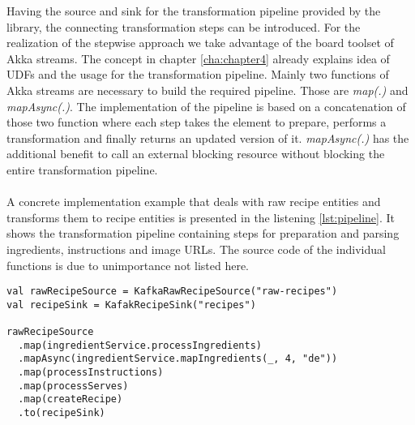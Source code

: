 Having the source and sink for the transformation pipeline provided by the library, the connecting transformation steps can be introduced. For the realization of the stepwise approach we take advantage of the board toolset of Akka streams. The concept in chapter \ref{cha:chapter4} already explains idea of UDFs and the usage for the transformation pipeline. Mainly two functions of Akka streams are necessary to build the required pipeline. Those are \textit{map(.)} and \textit{mapAsync(.)}. The implementation of the pipeline is based on a concatenation of those two function where each step takes the element to prepare, performs a transformation and finally returns an updated version of it. \textit{mapAsync(.)} has the additional benefit to call an external blocking resource without blocking the entire transformation pipeline. 
\\\\
A concrete implementation example that deals with raw recipe entities and transforms them to recipe entities is presented in the listening \ref{lst:pipeline}. It shows the transformation pipeline containing steps for preparation and parsing ingredients, instructions and image URLs. The source code of the individual functions is due to unimportance not listed here.

\begin{lstlisting}[style=myScalastyle,label={lst:pipeline},caption={Example transformation pipeline for raw recipes to recipes}]
val rawRecipeSource = KafkaRawRecipeSource("raw-recipes")
val recipeSink = KafakRecipeSink("recipes")

rawRecipeSource
  .map(ingredientService.processIngredients)
  .mapAsync(ingredientService.mapIngredients(_, 4, "de"))
  .map(processInstructions)
  .map(processServes)
  .map(createRecipe)
  .to(recipeSink)
\end{lstlisting}

